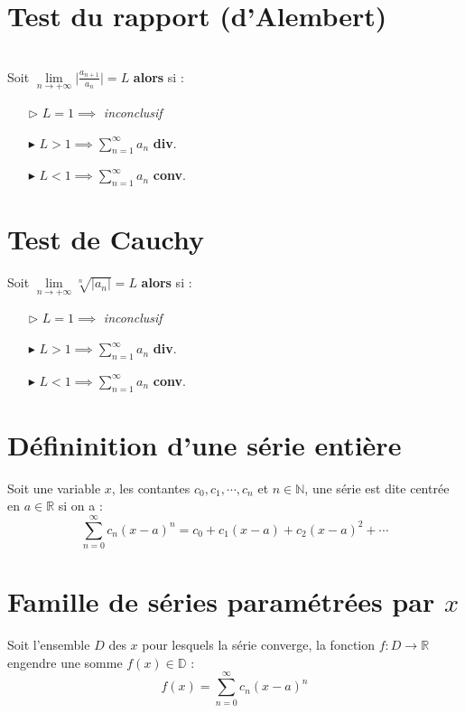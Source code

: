 \documentclass{report}
\begin{document}
\begin{multicols*}{3}
  \section{Test du rapport (d'Alembert)}
  \mbox{}\vspace{0.2em}\\
  Soit $\lim\limits_{n \to+\infty } \Big|\frac{a_{n+1}}{a_n}  \Big| = L$ 
  \textbf{alors} si :   
  \begin{itemize}
    \item [$\rhd$ ] $L = 1 \implies$ \textit{ inconclusif}  
    \item [$\blacktriangleright$ ] $L > 1 \implies \sum_{n=1}^{\infty } a_n$ 
      \textbf{div}.   
    \item [$\blacktriangleright$ ] $L < 1 \implies \sum_{n=1}^{\infty } a_n$ \textbf{conv}.   
  \end{itemize}



  \section{Test de Cauchy}
  \mbox{}\vspace{0.2em}
  Soit $\lim\limits_{n \to+\infty } \sqrt[n]{\big| a_n \big|} = L$ 
  \textbf{alors} si :   
  \begin{itemize}
    \item [$\rhd$ ] $L = 1 \implies$ \textit{inconclusif}  
    \item [$\blacktriangleright$ ] $L > 1 \implies \sum_{n=1}^{\infty }a_n$ 
      \textbf{div}.   
    \item [$\blacktriangleright$ ] $L < 1 \implies \sum_{n=1}^{\infty }a_n$ 
      \textbf{conv}.
  \end{itemize}

  \section{Défininition d'une série entière} Soit une variable 
  $x$, les contantes $c_0, c_1, \cdots , c_n$ 
  et $n \in \mathbb{N}$, une série 
  est dite centrée en $a \in \mathbb{R}$ si on a :  
  \[ \sum_{n=0}^{\infty } c_n(x-a)^n = c_0 + c_1(x-a) + c_2(x-a)^2 + \cdots \]

  \section{Famille de séries paramétrées par $x$} 
  Soit l'ensemble $D$ des $x$ pour lesquels la série converge, 
  la fonction $f : D \rightarrow  \mathbb{R}$ engendre une 
  somme $f(x) \in \mathbb{D}$ :
  \[ f(x) = \sum_{n=0}^{\infty } c_n(x - a)^n \]
  \vspace{-1.5em} %


\end{multicols*}
\end{document}
